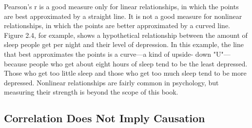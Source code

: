 Pearson's r is a good measure only for linear relationships, in which the points are best approximated by a straight line. It is not a good measure for nonlinear relationships, in which the points are better approximated by a curved line. Figure 2.4, for example, shows a hypothetical relationship between the amount of sleep people get per night and their level of depression. In this example, the line that best approximates the points is a curve---a kind of upside- down "U"---because people who get about eight hours of sleep tend to be the least depressed. Those who get too little sleep and those who get too much sleep tend to be more depressed. Nonlinear relationships are fairly common in psychology, but measuring their strength is beyond the scope of this book.

\subsection{Correlation Does Not Imply Causation}

